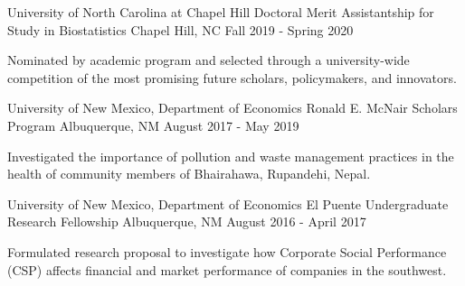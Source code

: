 \begin{cventries}
\cventry
{University of North Carolina at Chapel Hill} %
{Doctoral Merit Assistantship for Study in Biostatistics} %
{Chapel Hill, NC} %
{Fall 2019 - Spring 2020} %
{
\begin{cvitems} %
\item Nominated by academic program and selected through a university-wide competition of the most promising \newline future scholars, policymakers, and innovators.
  \end{cvitems}
}

\cventry
{University of New Mexico, Department of Economics} %
{Ronald E. McNair Scholars Program} %
{Albuquerque, NM} %
{August 2017 - May 2019} %
{
\begin{cvitems} %
\item Investigated the importance of pollution and waste management practices in the health of community members \newline of Bhairahawa, Rupandehi, Nepal. %
  \end{cvitems}
}

\cventry
{University of New Mexico, Department of Economics} %
{El Puente Undergraduate Research Fellowship} %
{Albuquerque, NM} %
{August 2016 - April 2017} %
{
\begin{cvitems} %
\item Formulated research proposal to investigate how Corporate Social Performance (CSP) affects financial and market \newline performance of companies in the southwest. %
  \end{cvitems}
}

\end{cventries}
